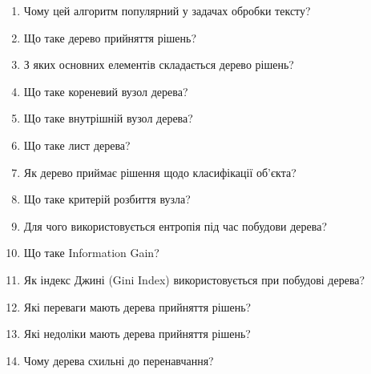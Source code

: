 \begin{enumerate}
\item Чому цей алгоритм популярний у задачах обробки тексту?
\item Що таке дерево прийняття рішень?
\item З яких основних елементів складається дерево рішень?
\item Що таке кореневий вузол дерева?
\item Що таке внутрішній вузол дерева?
\item Що таке лист дерева?
\item Як дерево приймає рішення щодо класифікації об'єкта?
\item Що таке критерій розбиття вузла?
\item Для чого використовується ентропія під час побудови дерева?
\item Що таке Information Gain?
\item Як індекс Джині (Gini Index) використовується при побудові дерева?
\item Які переваги мають дерева прийняття рішень?
\item Які недоліки мають дерева прийняття рішень?
\item Чому дерева схильні до перенавчання?
\end{enumerate}



